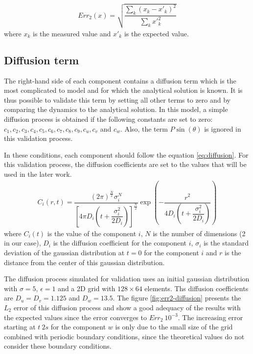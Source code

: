 \documentclass[a4paper]{article}
\begin{document}
\begin{align}
\label{eq:l2-error}
	Err_2(x)= \sqrt{\dfrac{\sum_k \left( x_k - x'_k \right)^2}{\sum_k x'^2_k}}
\end{align}
where $x_k$ is the measured value and $x'_k$ is the expected value.

\subsection{Diffusion term}

The right-hand side of each component contains a diffusion term which is the most complicated to model and for which the analytical solution is known. It is thus possible to validate this term by setting all other terms to zero and by comparing the dynamics to the analytical solution. In this model, a simple diffusion process is obtained if the following constants are set to zero: $c_1, c_2, c_3, c_4, c_5, c_6, c_7, c_8, c_9, c_u, c_v$ and $c_w$.
Also, the term $P \sin (\theta)$ is ignored in this validation process.

In these conditions, each component should follow the equation \ref{eq:diffusion}. For this validation process, the diffusion coefficients are set to the values that will be used in the later work.
\begin{align}
\label{eq:diffusion}
	C_i(r, t)= \dfrac{ \left( 2 \pi \right) ^\frac{N}{2} \sigma^N_i }{ \left[ 4 \pi D_i \left( t + \dfrac{\sigma^2_i}{2D_i} \right) \right]^\frac{N}{2} } \exp \left(- \dfrac{r^2}{4 D_i \left ( t + \dfrac{\sigma^2_i}{2D_i} \right) } \right)
\end{align}
where $C_i(t)$ is the value of the component $i$, $N$ is the number of dimensions (2 in our case), $D_i$ is the diffusion coefficient for the component $i$, $\sigma_i$ is the standard deviation of the gaussian distribution at $t=0$ for the component $i$ and $r$ is the distance from the center of this gaussian distribution.

The diffusion process simulated for validation uses an initial gaussian distribution with $\sigma = 5$, $\epsilon = 1$ and a 2D grid with $128 \times 64$ elements. Ths diffusion coefficients are $D_u = D_v = 1.125$ and $D_w = 13.5$. The figure \ref{fig:err2-diffusion} presents the $L_2$ error of this diffusion process and show a good adequacy of the results with the expected values since the error converges to $Err_2 ~ 10^{-3}$. The increasing error starting at $t~2s$ for the component $w$ is only due to the small size of the grid combined with periodic boundary conditions, since the theoretical values do not consider these boundary conditions.
\end{document}

